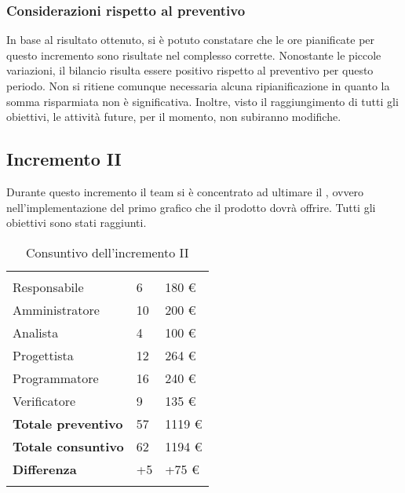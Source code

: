 \subsubsection{Considerazioni rispetto al preventivo}

In base al risultato ottenuto, si è potuto constatare che le ore pianificate per questo incremento sono risultate nel complesso corrette. Nonostante le piccole variazioni, il bilancio risulta essere positivo rispetto al preventivo per questo periodo. Non si ritiene comunque necessaria alcuna ripianificazione in quanto la somma risparmiata non è significativa. Inoltre, visto il raggiungimento di tutti gli obiettivi, le attività future, per il momento, non subiranno modifiche.

\newpage

\subsection{Incremento II}
Durante questo incremento il team si è concentrato ad ultimare il , ovvero nell'implementazione del primo grafico che il prodotto dovrà offrire. Tutti gli obiettivi sono stati raggiunti.%

{
\setlength\arrayrulewidth{1pt}
\begin{longtable}{ C{4cm} C{3cm} C{3.5cm}} 
 	 &
 	 &
 	 \\
 	
 	Responsabile & 6 & 180 € \\
 	Amministratore & 10 & 200 €\\
 	Analista & 4  & 100 € \\
 	Progettista & 12 & 264 € \\
 	Programmatore & 16  & 240 € \\
 	Verificatore & 9  & 135 €\\
 	
	\hline 	
 	
 	\textbf{Totale preventivo} &
	57 &
 	1119 € \\		
 	
 	\textbf{Totale consuntivo} &
	62 &
 	1194 € \\	
 	
 	\textbf{Differenza} &
	+5 &
 	+75 € \\	
 	
 	\caption{Consuntivo dell'incremento II}
\end{longtable}
}

